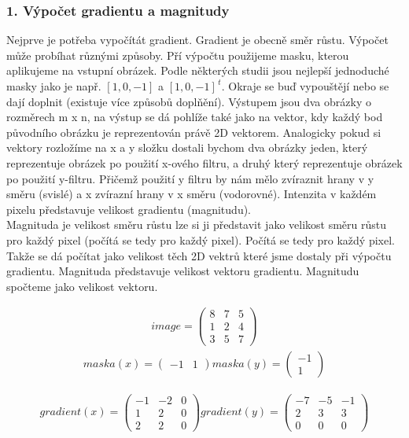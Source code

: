 \documentclass{report}
\begin{document}
\subsubsection{1. Výpočet gradientu a magnitudy}
Nejprve je potřeba vypočítát gradient. Gradient je obecně směr růstu. Výpočet může probíhat různými způsoby. Pří výpočtu použijeme masku, kterou aplikujeme na vstupní obrázek. Podle některých studii jsou nejlepší jednoduché masky jako je např. $[1, 0, -1]$ a $[1, 0, -1]^{\,t}$. Okraje se buď vypouštějí nebo se dají doplnit (existuje více způsobů doplňění). Výstupem jsou dva obrázky o rozměrech m x n, na výstup se dá pohlíže také jako na vektor, kdy každý bod původního obrázku je reprezentován právě 2D vektorem. Analogicky pokud si vektory rozložíme na x a y složku dostali bychom dva obrázky jeden, který reprezentuje obrázek po použití x-ového filtru, a druhý který reprezentuje obrázek po použití y-filtru. Přičemž použití y filtru by nám mělo zvíraznit hrany v y směru (svislé) a x zvírazní hrany v x směru (vodorovné). Intenzita v každém pixelu představuje velikost gradientu (magnitudu).\\
Magnituda je velikost směru růstu lze si ji představit jako velikost směru růstu pro každý pixel (počítá se tedy pro každý pixel). Počítá se tedy pro každý pixel. Takže se dá počítat jako velikost těch 2D vektrů které jsme dostaly při výpočtu gradientu. Magnituda představuje velikost vektoru gradientu. Magnitudu spočteme jako velikost vektoru.

\begin{align}
	\label{vstupni_matice}image = \begin{pmatrix}8 & 7 & 5 \\1 & 2 & 4 \\3 & 5 & 7 \end{pmatrix}
\end{align}
\begin{align}
	\label{masky}
		maska(x) = \begin{pmatrix}-1 & 1 \end{pmatrix} 
		maska(y) = \begin{pmatrix}-1 \\ 1 \end{pmatrix}
\end{align}

\begin{align}
	\label{vystupni_gradienty}
		gradient(x) = \begin{pmatrix}-1 & -2 & 0\\1 & 2 & 0 \\2 & 2 & 0 \end{pmatrix}
		gradient(y) = \begin{pmatrix}-7 & -5 & -1 \\2 & 3 & 3 \\0 & 0 & 0 \end{pmatrix}
\end{align}
\end{document}
